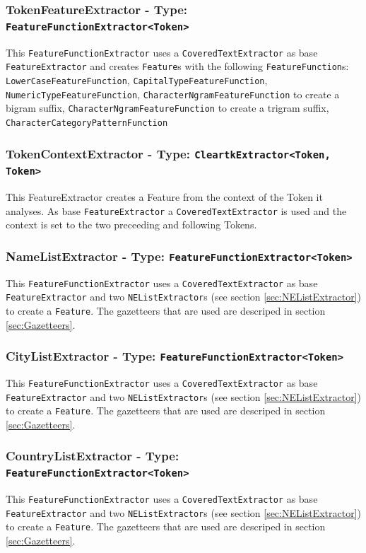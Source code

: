 \documentclass[11pt, english]{article}
\begin{document}
\subsubsection*{TokenFeatureExtractor - Type: \texttt{FeatureFunctionExtractor<Token>}}
This \verb/FeatureFunctionExtractor/ uses a \verb/CoveredTextExtractor/ as base \verb/FeatureExtractor/ and creates \verb/Feature/s with the following \verb/FeatureFunction/s: \verb/LowerCaseFeatureFunction/, \verb/CapitalTypeFeatureFunction/, \verb/NumericTypeFeatureFunction/, \verb/CharacterNgramFeatureFunction/ to create a bigram suffix, \verb/CharacterNgramFeatureFunction/ to create a trigram suffix, \verb/CharacterCategoryPatternFunction/

\subsubsection*{TokenContextExtractor - Type: \texttt{CleartkExtractor<Token, Token>}}
This FeatureExtractor creates a Feature from the context of the Token it analyses. As base \verb/FeatureExtractor/ a \verb/CoveredTextExtractor/ is used and the context is set to the two preceeding and following Tokens.

\subsubsection*{NameListExtractor - Type: \texttt{FeatureFunctionExtractor<Token>}}
This \verb/FeatureFunctionExtractor/ uses a \verb/CoveredTextExtractor/ as base \verb/FeatureExtractor/ and two \verb/NEListExtractor/s (see section \ref{sec:NEListExtractor}) to create a \verb/Feature/. The gazetteers that are used are descriped in section \ref{sec:Gazetteers}.

\subsubsection*{CityListExtractor - Type: \texttt{FeatureFunctionExtractor<Token>}}
This \verb/FeatureFunctionExtractor/ uses a \verb/CoveredTextExtractor/ as base \verb/FeatureExtractor/ and two \verb/NEListExtractor/s (see section \ref{sec:NEListExtractor}) to create a \verb/Feature/. The gazetteers that are used are descriped in section \ref{sec:Gazetteers}.

\subsubsection*{CountryListExtractor - Type: \texttt{FeatureFunctionExtractor<Token>}}
This \verb/FeatureFunctionExtractor/ uses a \verb/CoveredTextExtractor/ as base \verb/FeatureExtractor/ and two \verb/NEListExtractor/s (see section \ref{sec:NEListExtractor}) to create a \verb/Feature/. The gazetteers that are used are descriped in section \ref{sec:Gazetteers}.
\end{document}
